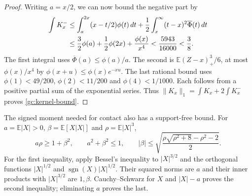 \documentclass[aop,preprint]{imsart}
\theoremstyle{definition}
\newcommand{\E}{\mathbb E}
\numberwithin{equation}{section}
\begin{document}
\begin{proof}
Writing $a=x/2$, we can now bound the negative part by
\begin{align}\label{gc:negative-part}
 \int K_x^-&\le\int_a^{2x}(x-t/2)\phi(t)\,dt
       +\frac12\int_x^\infty(t-x)^2\overline\Phi(t)\,dt\notag\\
 &\le\frac32\phi(a)+\frac12\phi(2x)+\frac{\phi(x)}{x^4}
 <\frac{5943}{16000}<\frac38.
\end{align}
The first integral uses $\overline\Phi(a)\le\phi(a)/a$.
The second is $\E(Z-x)_+^3/6$, at most $\phi(x)/x^4$ by
$\phi(x+u)\le\phi(x)e^{-xu}$. The last rational bound uses
$\phi(1)<49/200$, $\phi(2)<11/200$ and $\phi(4)<1/1000$.
Each follows from a positive partial sum of the exponential series.
Thus $\|K_x\|_1=\int K_x+2\int K_x^-$ proves
\eqref{gc:kernel-bound}.

\end{proof}

The signed moment needed for contact also has a support-free bound.
For $a=\E|X|>0$, $\beta=\E[X|X|]$ and $\rho=\E|X|^3$,
\begin{equation}\label{ut:initial-signed-moment}
 a\rho\ge1+\beta^2,\qquad a^2+\beta^2\le1,\qquad
 |\beta|\le\sqrt{\frac{\rho\sqrt{\rho^2+8}-\rho^2-2}{2}}.
\end{equation}
For the first inequality, apply Bessel's inequality to $|X|^{3/2}$
and the orthogonal functions $|X|^{1/2}$ and
$\operatorname{sgn}(X)|X|^{1/2}$. Their squared norms are $a$ and
their inner products with $|X|^{3/2}$ are $1,\beta$.
Cauchy--Schwarz for $X$ and $|X|-a$ proves the second inequality;
eliminating $a$ proves the last.
\end{document}
